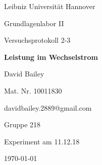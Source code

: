 \begin{titlepage}
	\centering
	{Leibniz Universität Hannover\par}
	{\large Grundlagenlabor II\par}	

	\vspace{3cm}	
	
	{\Large Versuchsprotokoll 2-3 \par}
	{\huge \bf Leistung im Wechselstrom\par}
	\vspace{0.3cm}
	
	\vspace{1.5cm}
	
	{\Large David Bailey\par}
	{\large Mat. Nr. 10011830\par}
	{\large davidbailey.2889@gmail.com\par}	
	
	\vspace{0.8cm}	
	
	{\large Gruppe 218\par}
	
	\vspace{0.8cm}
		
	{\large Experiment am 11.12.18\par}

	\vfill

	{\large \today\par}
\end{titlepage}